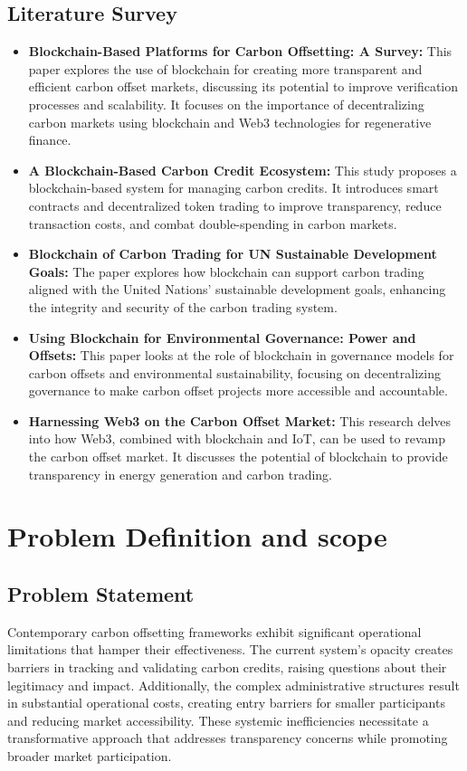 \documentclass[oneside,a4paper,12pt]{book}
\begin{document}
\section{Literature Survey}
\begin{itemize}
\item \textbf{Blockchain-Based Platforms for Carbon Offsetting: A Survey:} This paper explores the use of blockchain for creating more transparent and efficient carbon offset markets, discussing its potential to improve verification processes and scalability. It focuses on the importance of decentralizing carbon markets using blockchain and Web3 technologies for regenerative finance.

\item \textbf{A Blockchain-Based Carbon Credit Ecosystem:} This study proposes a blockchain-based system for managing carbon credits. It introduces smart contracts and decentralized token trading to improve transparency, reduce transaction costs, and combat double-spending in carbon markets.

\item \textbf{Blockchain of Carbon Trading for UN Sustainable Development Goals:} The paper explores how blockchain can support carbon trading aligned with the United Nations' sustainable development goals, enhancing the integrity and security of the carbon trading system.

\item \textbf{Using Blockchain for Environmental Governance: Power and Offsets:} This paper looks at the role of blockchain in governance models for carbon offsets and environmental sustainability, focusing on decentralizing governance to make carbon offset projects more accessible and accountable.

\item \textbf{Harnessing Web3 on the Carbon Offset Market:} This research delves into how Web3, combined with blockchain and IoT, can be used to revamp the carbon offset market. It discusses the potential of blockchain to provide transparency in energy generation and carbon trading.
\end{itemize}

\chapter{Problem Definition and scope}
\section{Problem Statement}
Contemporary carbon offsetting frameworks exhibit significant operational limitations that hamper their effectiveness. The current system's opacity creates barriers in tracking and validating carbon credits, raising questions about their legitimacy and impact. Additionally, the complex administrative structures result in substantial operational costs, creating entry barriers for smaller participants and reducing market accessibility. These systemic inefficiencies necessitate a transformative approach that addresses transparency concerns while promoting broader market participation.
\end{document}
